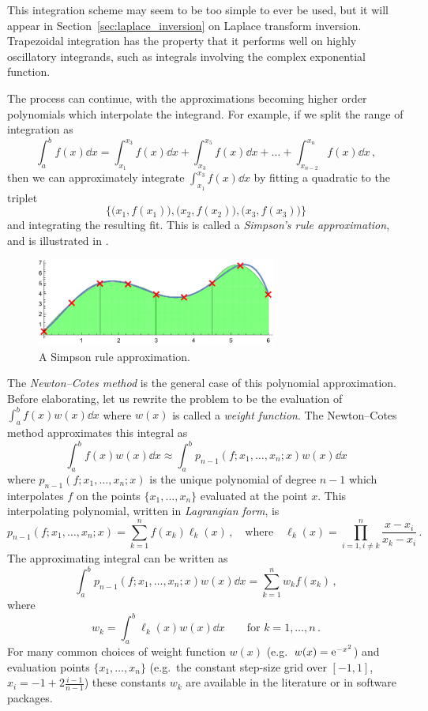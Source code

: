 This integration scheme may seem to be too simple to ever be used, but it will appear in Section~\ref{sec:laplace_inversion} on Laplace transform inversion. Trapezoidal integration has the property that it performs well on highly oscillatory integrands, such as integrals involving the complex exponential function.

The process can continue, with the approximations becoming higher order polynomials which interpolate the integrand. For example, if we split the range of integration as
\[ \int_a^b f(x) \dd x = \int_{x_1}^{x_3} f(x) \dd x + \int_{x_3}^{x_5} f(x) \dd x + \dots + \int_{x_{n-2}}^{x_n} f(x) \dd x \,, \]
then we can approximately integrate $\int_{x_1}^{x_3} f(x) \dd x$ by fitting a quadratic to the triplet \[ \bigl\{ \bigl( x_1, f(x_1) \bigr), \bigl(x_2, f(x_2)\bigr), \bigl(x_3, f(x_3)\bigr) \bigr\} \]
and integrating the resulting fit. This is called a \emph{Simpson's rule approximation}, and is illustrated in .

\begin{figure}[H]
\centering
\includegraphics[width=0.7\textwidth]{images/simpson.pdf}
\caption{A Simpson rule approximation.}
\label{fig:simpson}
\end{figure}

The \emph{Newton--Cotes method} is the general case of this polynomial approximation.
Before elaborating, let us rewrite the problem to be the evaluation of $\int_a^b f(x) w(x) \dd x$ where $w(x)$ is called a \emph{weight function}.
The Newton--Cotes method approximates this integral as
\begin{equation} \label{NewtonCotesApprox}
\int_a^b f(x) w(x) \dd x \approx \int_a^b p_{n-1}(f; x_1, \dots, x_n; x) w(x) \dd x
\end{equation}
where $p_{n-1}(f; x_1, \dots, x_n; x)$ is the unique polynomial of degree $n-1$ which interpolates $f$ on the points $\{ x_1, \dots, x_n\}$ evaluated at the point $x$.
This interpolating polynomial, written in \emph{Lagrangian form}, is
\[ p_{n-1}(f; x_1, \dots, x_n; x) = \sum_{k=1}^{n} f(x_k) \ell_k(x) \,, \quad \text{where} \quad \ell_k(x) = \prod_{i=1, i\not=k}^n \frac{x - x_i}{x_k - x_i}  \,. \]
The approximating integral can be written as
\[ \int_a^b p_{n-1}(f; x_1, \dots, x_n; x) w(x) \dd x = \sum_{k=1}^n w_k f(x_k) \,, \]
where
\begin{equation} \label{NewtonCotesWeights}
	w_k = \int_a^b \ell_k(x) w(x) \dd x \qquad \text{for } k=1,\dots,n \,.
\end{equation}
For many common choices of weight function $w(x)$ (e.g.\ $w(x) = \mathrm{e}^{-x^2}$) and evaluation points $\{x_1,\dots,x_n\}$ (e.g.\ the constant step-size grid over $[-1,1]$, $x_i = -1 + 2 \frac{i-1}{n-1}$) these constants $w_k$ are available in the literature or in software packages.

